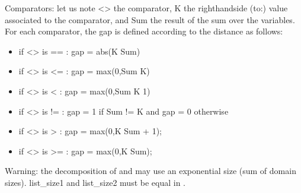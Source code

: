 \documentclass[letterpaper,10pt,openany,oneside,english]{sphinxmanual}
\begin{document}
\begin{itemize}
\begin{itemize}
\begin{sphinxVerbatim}[commandchars=\\\{\}]
  \PYG{p}{[}   \PYG{p}{]}
           
          
             
             
             
\end{sphinxVerbatim}

\end{itemize}

\sphinxAtStartPar
Comparators: let us note \textless{}\textgreater{} the comparator, K the right\sphinxhyphen{}hand\sphinxhyphen{}side (to:) value associated to the comparator, and Sum the result of the sum over the variables. For each comparator, the gap is defined according to the distance as follows:
\begin{itemize}
\item {} 
\sphinxAtStartPar
if \textless{}\textgreater{} is == : gap = abs(K \sphinxhyphen{} Sum)

\item {} 
\sphinxAtStartPar
if \textless{}\textgreater{} is \textless{}= : gap = max(0,Sum \sphinxhyphen{} K)

\item {} 
\sphinxAtStartPar
if \textless{}\textgreater{} is \textless{} : gap = max(0,Sum \sphinxhyphen{} K \sphinxhyphen{} 1)

\item {} 
\sphinxAtStartPar
if \textless{}\textgreater{} is != : gap = 1 if Sum != K and gap = 0 otherwise

\item {} 
\sphinxAtStartPar
if \textless{}\textgreater{} is \textgreater{} : gap = max(0,K \sphinxhyphen{} Sum + 1);

\item {} 
\sphinxAtStartPar
if \textless{}\textgreater{} is \textgreater{}= : gap = max(0,K \sphinxhyphen{} Sum);

\end{itemize}

\end{itemize}

\sphinxAtStartPar
Warning: the decomposition of  and  may use an exponential size (sum of domain sizes). list\_size1 and list\_size2 must be equal in .
\end{document}
